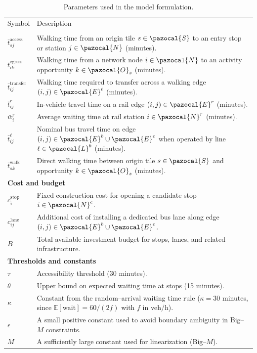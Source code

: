\documentclass[3p,times,procedia]{elsarticle}
\begin{document}
\begin{table}[h]
\caption{Parameters used in the model formulation.}
\begin{tabularx}{\hsize}{@{\extracolsep{\fill}}lX@{}}
\toprule
Symbol & Description \\
\colrule
\multicolumn{2}{l}{\textbf{Travel-time related}} \\
$\bar{t}_{sj}^{\text{access}}$ & Walking time from an origin tile $s \in \pazocal{S}$ to an entry stop or station $j \in \pazocal{N}$ (minutes). \\
$\bar{t}_{ik}^{\text{egress}}$ & Walking time from a network node $i \in \pazocal{N}$ to an activity opportunity $k \in \pazocal{O}_s$ (minutes). \\
$\bar{t}_{ij}^{\text{transfer}}$ & Walking time required to transfer across a walking edge $(i,j) \in \pazocal{E}^t$ (minutes). \\
$\bar{t}_{ij}^r$ & In-vehicle travel time on a rail edge $(i,j) \in \pazocal{E}^r$ (minutes). \\
$\bar{w}_i^r$ & Average waiting time at rail station $i \in \pazocal{N}^r$ (minutes). \\
$\bar{t}_{ij}^\ell$ & Nominal bus travel time on edge $(i,j) \in \pazocal{E}^b \cup \pazocal{E}^c$ when operated by line $\ell \in \pazocal{L}^b$ (minutes). \\
$\bar{t}_{sk}^{\text{walk}}$ & Direct walking time between origin tile $s \in \pazocal{S}$ and opportunity $k \in \pazocal{O}_s$ (minutes). \\

\multicolumn{2}{l}{\textbf{Cost and budget}} \\
$c_i^{\text{stop}}$ & Fixed construction cost for opening a candidate stop $i \in \pazocal{N}^c$. \\
$c_{ij}^{\text{lane}}$ & Additional cost of installing a dedicated bus lane along edge $(i,j) \in \pazocal{E}^b \cup \pazocal{E}^c$. \\
$B$ & Total available investment budget for stops, lanes, and related infrastructure. \\

\multicolumn{2}{l}{\textbf{Thresholds and constants}} \\
$\tau$ & Accessibility threshold (30 minutes). \\
$\theta$ & Upper bound on expected waiting time at stops (15 minutes). \\
$\kappa$ & Constant from the random–arrival waiting time rule ($\kappa = 30$ minutes, since $\mathbb{E}[\text{wait}] = 60/(2f)$ with $f$ in veh/h). \\
$\epsilon$ & A small positive constant used to avoid boundary ambiguity in Big–$M$ constraints. \\
$M$ & A sufficiently large constant used for linearization (Big–$M$). \\


\end{tabularx}
\end{table}
\end{document}
